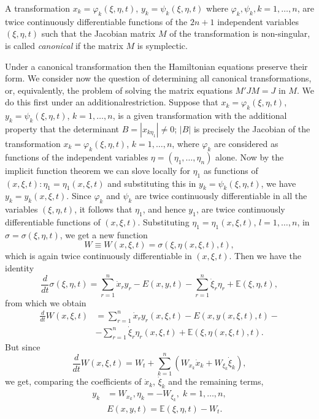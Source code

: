A transformation $x_k = \varphi_k (\xi, \eta, t)$, $y_k = \psi_k(\xi, \eta, t)$ where $\varphi_k, \psi_k, k =1 , \ldots, n$, are twice continuously differentiable functions of the $2n+1$ independent variables $(\xi, \eta, t)$ such that the Jacobian matrix $M$ of the transformation is non-singular, is called {\em canonical} if the matrix $M$ is symplectic.

Under a canonical transformation then the Hamiltonian equations preserve their form. We consider now the question of determining all canonical transformations, or, equivalently, the problem of solving the matrix equations $M'J M = J$ in $M$. We do this first under an additional\pageoriginale restriction. Suppose that $x_k = \varphi_k(\xi, \eta, t)$, $y_k = \psi_k (\xi, \eta, t)$, $k =1, \ldots, n$, is a given  transformation with the additional property that the determinant $B = |x_{k\eta_1}| \neq 0$; $|B|$ is precisely the Jacobian of the transformation $x_k = \varphi_k (\xi, \eta, t)$, $k =1 , \ldots, n$, where $\varphi_k$ are considered as functions of the independent variables $\eta= (\eta_1, \ldots, \eta_n) $ alone. Now by the implicit function theorem we can slove locally for $\eta_1$ as functions of $(x, \xi,t) : \eta_1 = \eta_1 (x, \xi, t)$ and substituting this in $y_k = \psi_k(\xi, \eta, t)$, we have $y_k = y_k (x,\xi, t)$. Since $\varphi_k$ and $\psi_k$ are twice continuously differentiable in all the variables $(\xi, \eta, t)$, it follows that $\eta_1$, and hence $y_1$, are twice continuously differentiable functions of $(x,\xi, t)$. Substituting $\eta_1 = \eta_1 (x, \xi, t)$, $l =1, \ldots, n$, in $\sigma = \sigma (\xi, \eta, t)$, we get a new function
$$
W \equiv W (x, \xi, t) = \sigma (\xi, \eta (x, \xi, t), t),
$$
which is again twice continuously differentiable in $(x, \xi, t)$. Then we have the identity
$$
\frac{d}{dt} \sigma (\xi, \eta, t) = \sum\limits^n_{r=1} \dot{x}_r y_r - E(x,y,t) - \sum\limits^n_{r=1} \dot{\xi}_r \eta_r + \mathbb{E} (\xi, \eta, t),
$$
from which we obtain
\begin{align*}
\frac{d}{dt } W (x, \xi, t) & = \sum\limits^n_{r=1} \dot{x}_r y_r (x, \xi, t) - E (x, y(x, \xi, t), t) - \\
& - \sum\limits^n_{r=1} \dot{\xi}_r \eta_r(x, \xi, t) + \mathbb{E} (\xi, \eta (x, \xi, t),t).
\end{align*}
But since
$$
\frac{d}{dt} W(x, \xi, t) = W_t + \sum\limits^n_{k=1} (W_{x_k} \dot{x}_k  + W_{\xi_k} \dot{\xi}_k),
$$\pageoriginale
we get, comparing the coefficients of $\dot{x}_k$, $\dot{\xi}_k$ and the remaining terms,
\begin{align*}
y_k & = W_{x_k}, \eta_k = - W_{\xi_k}, \; k =1, \ldots, n,\\
& E(x,y,t) = \mathbb{E} (\xi, \eta, t) - W_t.  \tag{1.2.14}\label{chap1:eq1.2.14}
\end{align*}
